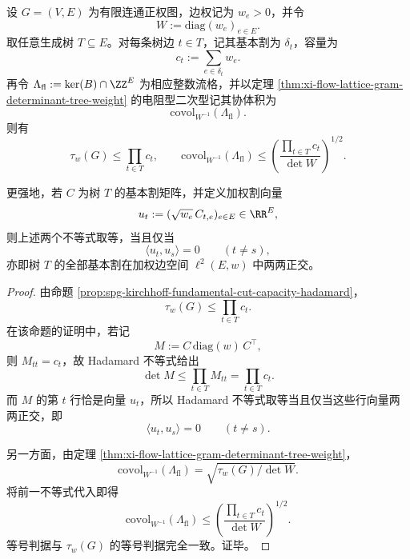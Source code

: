 \begin{theorem}\label{thm:conclusion-fundamental-cut-hadamard-rigidity}
设 \(G=(V,E)\) 为有限连通正权图，边权记为 \(w_e>0\)，并令
\[
W:=\mathrm{diag}(w_e)_{e\in E}.
\]
取任意生成树 \(T\subseteq E\)。对每条树边 \(t\in T\)，记其基本割为 \(\delta_t\)，容量为
\[
c_t:=\sum_{e\in\delta_t}w_e.
\]
再令 \(\Lambda_{\mathrm{fl}}:=\ker(B)\cap\ZZ^E\) 为相应整数流格，并以定理 \ref{thm:xi-flow-lattice-gram-determinant-tree-weight} 的电阻型二次型记其协体积为
\[
\mathrm{covol}_{W^{-1}}(\Lambda_{\mathrm{fl}}).
\]
则有
\[
\tau_w(G)\le \prod_{t\in T}c_t,
\qquad
\mathrm{covol}_{W^{-1}}(\Lambda_{\mathrm{fl}})
\le
\left(\frac{\prod_{t\in T}c_t}{\det W}\right)^{1/2}.
\]

更强地，若 \(C\) 为树 \(T\) 的基本割矩阵，并定义加权割向量
\[
u_t:=(\sqrt{w_e}\,C_{t,e})_{e\in E}\in\RR^E,
\]
则上述两个不等式取等，当且仅当
\[
\langle u_t,u_s\rangle=0
\qquad (t\neq s),
\]
亦即树 \(T\) 的全部基本割在加权边空间 \(\ell^2(E,w)\) 中两两正交。
\end{theorem}
\begin{proof}
由命题 \ref{prop:spg-kirchhoff-fundamental-cut-capacity-hadamard}，
\[
\tau_w(G)\le \prod_{t\in T}c_t.
\]
在该命题的证明中，若记
\[
M:=C\,\mathrm{diag}(w)\,C^\top,
\]
则 \(M_{tt}=c_t\)，故 Hadamard 不等式给出
\[
\det M\le \prod_{t\in T}M_{tt}=\prod_{t\in T}c_t.
\]
而 \(M\) 的第 \(t\) 行恰是向量 \(u_t\)，所以 Hadamard 不等式取等当且仅当这些行向量两两正交，即
\[
\langle u_t,u_s\rangle=0
\qquad (t\neq s).
\]

另一方面，由定理 \ref{thm:xi-flow-lattice-gram-determinant-tree-weight}，
\[
\mathrm{covol}_{W^{-1}}(\Lambda_{\mathrm{fl}})
=
\sqrt{\tau_w(G)/\det W}.
\]
将前一不等式代入即得
\[
\mathrm{covol}_{W^{-1}}(\Lambda_{\mathrm{fl}})
\le
\left(\frac{\prod_{t\in T}c_t}{\det W}\right)^{1/2}.
\]
等号判据与 \(\tau_w(G)\) 的等号判据完全一致。证毕。
\end{proof}

